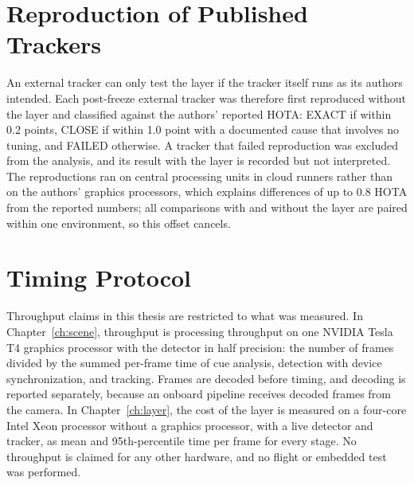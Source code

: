 \section{Reproduction of Published Trackers}\label{sec:m-repro}
An external tracker can only test the layer if the tracker itself runs as its authors intended. Each post-freeze external tracker was therefore first reproduced without the layer and classified against the authors' reported HOTA: EXACT if within 0.2 points, CLOSE if within 1.0 point with a documented cause that involves no tuning, and FAILED otherwise. A tracker that failed reproduction was excluded from the analysis, and its result with the layer is recorded but not interpreted. The reproductions ran on central processing units in cloud runners rather than on the authors' graphics processors, which explains differences of up to 0.8 HOTA from the reported numbers; all comparisons with and without the layer are paired within one environment, so this offset cancels.

\section{Timing Protocol}\label{sec:m-timing}
Throughput claims in this thesis are restricted to what was measured. In Chapter~\ref{ch:scene}, throughput is processing throughput on one NVIDIA Tesla T4 graphics processor with the detector in half precision: the number of frames divided by the summed per-frame time of cue analysis, detection with device synchronization, and tracking. Frames are decoded before timing, and decoding is reported separately, because an onboard pipeline receives decoded frames from the camera. In Chapter~\ref{ch:layer}, the cost of the layer is measured on a four-core Intel Xeon processor without a graphics processor, with a live detector and tracker, as mean and 95th-percentile time per frame for every stage. No throughput is claimed for any other hardware, and no flight or embedded test was performed.
